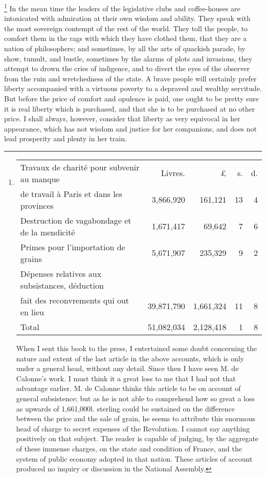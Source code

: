 \footnote{
\begin{center}
\begin{tabular}{l r r r r}
Travaux de charité pour subvenir au manque & Livres. &	£ &	s. & d. \\
\hspace{0.3cm}de travail à Paris et dans les provinces   & 3,866,920 & 161,121 & 13 & 4 \\
Destruction de vagabondage et de la mendicité & 1,671,417 & 69,642 & 7 & 6 \\
Primes pour l'importation de grains	& 5,671,907 & 235,329 & 9 & 2 \\
Dépenses relatives aux subsistances, déduction  & & & & \\
\hspace{0.3cm}fait des reconvrements qui out en lieu & 39,871,790 & 1,661,324 & 11 & 8 \\
Total	& 51,082,034	& 2,128,418	& 1	& 8
\end{tabular}
\end{center}
When I sent this book to the press, I entertained some doubt concerning the nature and extent of the last article in the above accounts, which is only under a general head, without any detail. Since then I have seen M. de Calonne's work. I must think it a great loss to me that I had not that advantage earlier. M. de Calonne thinks this article to be on account of general subsistence; but as he is not able to comprehend how so great a loss as upwards of 1,661,000l. sterling could be sustained on the difference between the price and the sale of grain, he seems to attribute this enormous head of charge to secret expenses of the Revolution. I cannot say anything positively on that subject. The reader is capable of judging, by the aggregate of these immense charges, on the state and condition of France, and the system of public economy adopted in that nation. These articles of account produced no inquiry or discussion in the National Assembly.
}
 In the mean time the leaders of the legislative clubs and coffee-houses are intoxicated with admiration at their own wisdom and ability. They speak with the most sovereign contempt of the rest of the world. They toll the people, to comfort them in the rags with which they have clothed them, that they are a nation of philosophers; and sometimes, by all the arts of quackish parade, by show, tumult, and bustle, sometimes by the alarms of plots and invasions, they attempt to drown the cries of indigence, and to divert the eyes of the observer from the ruin and wretchedness of the state. A brave people will certainly prefer liberty accompanied with a virtuous poverty to a depraved and wealthy servitude. But before the price of comfort and opulence is paid, one ought to be pretty sure it is real liberty which is purchased, and that she is to be purchased at no other price. I shall always, however, consider that liberty as very equivocal in her appearance, which has not wisdom and justice for her companions, and does not lead prosperity and plenty in her train.

